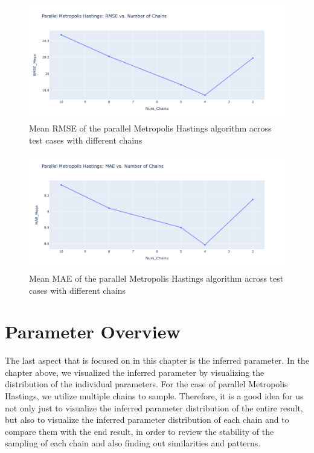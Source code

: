 \begin{figure}[H]
    \centering
    \includegraphics[width=1\textwidth]{figures/parallel_mh/rmse.png}
    \captionsetup{width=.8\textwidth}
    \caption{Mean RMSE of the parallel Metropolis Hastings algorithm across test cases with different chains}
    \label{fig:enter-label}
\end{figure}

\begin{figure}[H]
    \centering
    \includegraphics[width=1\textwidth]{figures/parallel_mh/mae.png}
    \captionsetup{width=.8\textwidth}
    \caption{Mean MAE of the parallel Metropolis Hastings algorithm across test cases with different chains}
    \label{fig:enter-label}
\end{figure}

\section{Parameter Overview}
The last aspect that is focused on in this chapter is the inferred parameter. In the chapter above, we visualized the inferred parameter by visualizing the distribution of the individual parameters. For the case of parallel Metropolis Hastings, we utilize multiple chains to sample. Therefore, it is a good idea for us not only just to visualize the inferred parameter distribution of the entire result, but also to visualize the inferred parameter distribution of each chain and to compare them with the end result, in order to review the stability of the sampling of each chain and also finding out similarities and patterns.

